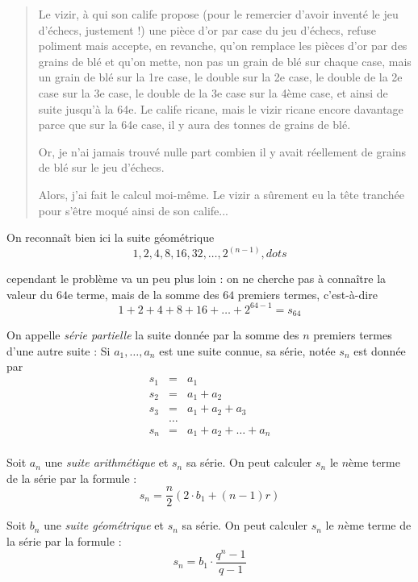 \begin{quote}
Le vizir, à qui son calife propose (pour le remercier d'avoir inventé le jeu d'échecs, justement !) une pièce d'or par case du jeu d'échecs, refuse poliment mais accepte, en revanche, qu'on remplace les pièces d'or par des grains de blé et qu'on mette, non pas un grain de blé sur chaque case, mais un grain de blé sur la 1re case, le double sur la 2e case, le double de la 2e case sur la 3e case, le double de la 3e case sur la 4ème case, et ainsi de suite jusqu'à la 64e.
Le calife ricane, mais le vizir ricane encore davantage parce que sur la 64e case, il y aura des tonnes de grains de blé.

Or, je n'ai jamais trouvé nulle part combien il y avait réellement de grains de blé sur le jeu d'échecs.

Alors, j'ai fait le calcul moi-même. Le vizir a sûrement eu la tête tranchée pour s'être moqué ainsi de son calife...
\end{quote}

On reconnaît bien ici la suite géométrique 
$$
1,2,4,8,16,32,\dots, 2^{(n-1)}, dots
$$

cependant le problème va un peu plus loin : on ne cherche pas à connaître la valeur du $64$e terme, mais de la somme des $64$ premiers termes, c'est-à-dire
$$
1+2+4+8+16+\dots + 2^{64-1} = s_{64}
$$

\begin{definition}
On appelle \emph{série partielle} la suite donnée par la somme des $n$ premiers termes d'une autre suite :
Si $a_1, \dots, a_n$ est une suite connue, sa série, notée $s_n$ est donnée par
$$
\begin{array}{lcl}
s_1 &=& a_1\\
s_2 &=& a_1+a_2\\
s_3 &=& a_1 + a_2 + a_3\\
& \dots & \\
s_n &=& a_1 + a_2 + \dots + a_n\\
\end{array}
$$
\end{definition}

\begin{theoreme}
Soit $a_n$ une \emph{suite arithmétique} et $s_n$ sa série. On peut calculer $s_n$ le $n$ème terme de la série par la formule :
$$
s_n = \frac{n}{2}\left(2\cdot b_1 + (n-1) r \right)
$$

Soit $b_n$ une \emph{suite géométrique} et $s_n$ sa série. On peut calculer $s_n$ le $n$ème terme de la série par la formule :
$$
s_n = b_1 \cdot \frac{q^n-1}{q-1}
$$
\end{theoreme}

